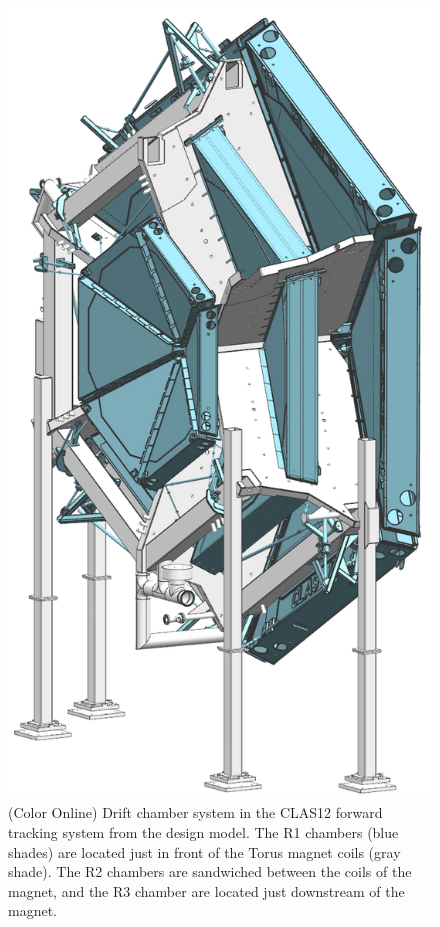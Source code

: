 \documentclass[final,3p,twocolumn]{elsarticle}
\begin{document}
\begin{figure}[htbp!]
\centerline{\includegraphics[width=0.95\columnwidth]{dc-view-4.png}}
\caption{(Color Online) Drift chamber system in the CLAS12 forward tracking system from the design model. 
The R1 chambers (blue shades) are located just in front of the Torus magnet coils (gray shade). 
The R2 chambers are sandwiched between the coils 
of the magnet, and the R3 chamber are located just downstream of the magnet.}
\label{clas12-dc}
\end{figure}
\end{document}
